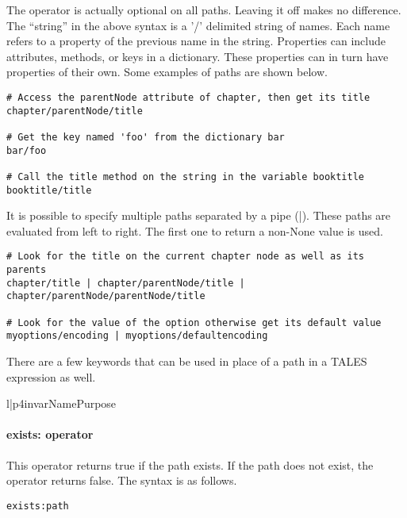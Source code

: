 The  operator is actually optional on all paths.  Leaving it
off makes no difference.  The ``string'' in the above syntax is a '/'
delimited string of names.  Each name refers to a property of the
previous name in the string.  Properties can include attributes, methods,
or keys in a dictionary.  These properties can in turn have properties
of their own.  Some examples of paths are shown below.
\begin{verbatim}
# Access the parentNode attribute of chapter, then get its title
chapter/parentNode/title

# Get the key named 'foo' from the dictionary bar
bar/foo

# Call the title method on the string in the variable booktitle
booktitle/title
\end{verbatim}

It is possible to specify multiple paths separated by a pipe (|).
These paths are evaluated from left to right.  The first one to return
a non-None value is used.
\begin{verbatim}
# Look for the title on the current chapter node as well as its parents
chapter/title | chapter/parentNode/title | chapter/parentNode/parentNode/title

# Look for the value of the option otherwise get its default value
myoptions/encoding | myoptions/defaultencoding
\end{verbatim}

There are a few keywords that can be used in place of a path in a
TALES expression as well.
\begin{tableii}{l|p{4in}}{var}{Name}{Purpose}
\end{tableii}


\paragraph{exists: operator}

This operator returns true if the path exists.  If the path does not exist,
the operator returns false.   The syntax is as follows.
\begin{verbatim}
exists:path
\end{verbatim}

